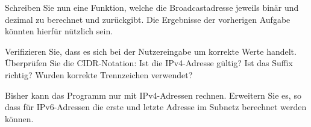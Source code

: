 \documentclass[11pt, a4paper, oneside]{article}
\begin{document}
	Schreiben Sie nun eine Funktion, welche die Broadcastadresse jeweils binär und dezimal zu berechnet und zurückgibt.
	Die Ergebnisse der vorherigen Aufgabe könnten hierfür nützlich sein.
	
	
	Verifizieren Sie, dass es sich bei der Nutzereingabe um korrekte Werte handelt.
	Überprüfen Sie die CIDR-Notation: Ist die IPv4-Adresse gültig? Ist das Suffix richtig? Wurden korrekte Trennzeichen verwendet?
	
	
	Bisher kann das Programm nur mit IPv4-Adressen rechnen.
	Erweitern Sie es, so dass für IPv6-Adressen die erste und letzte Adresse im Subnetz berechnet werden können.
	
\end{document}
